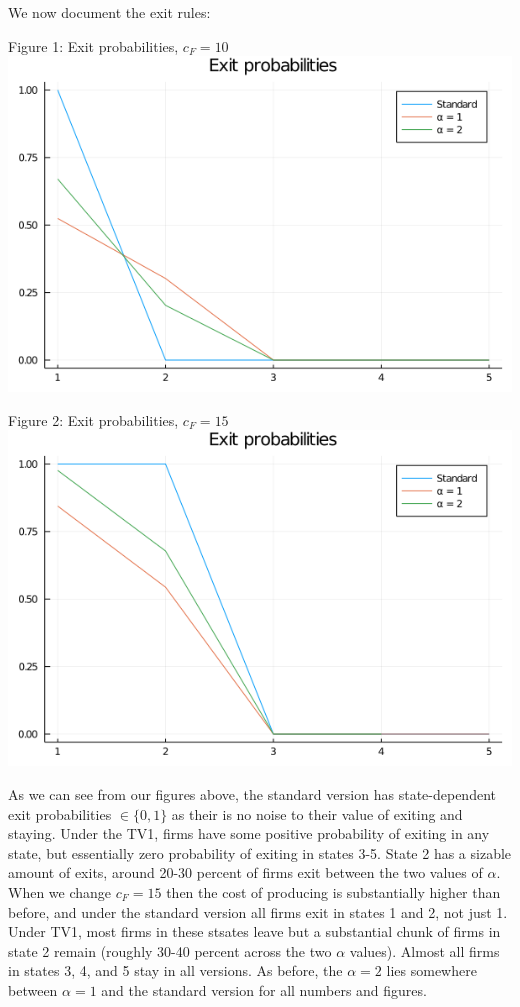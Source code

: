 \documentclass[11pt]{article} %
\begin{document}
We now document the exit rules:

\begin{center}
Figure 1: Exit probabilities, $c_F = 10$
\includegraphics[scale=0.5]{exit_prob_1}

\bigskip

Figure 2: Exit probabilities, $c_F = 15$
\includegraphics[scale=0.5]{exit_prob_2}
\end{center}

As we can see from our figures above, the standard version has state-dependent exit probabilities $\in \{0,1\}$ as their is no noise to their value of exiting and staying. Under the TV1, firms have some positive probability of exiting in any state, but essentially zero probability of exiting in states 3-5. State 2 has a sizable amount of exits, around 20-30 percent of firms exit between the two values of $\alpha$. When we change $c_F = 15$ then the cost of producing is substantially higher than before, and under the standard version all firms exit in states 1 and 2, not just 1. Under TV1, most firms in these stsates leave but a substantial chunk of firms in state 2 remain (roughly 30-40 percent across the two $\alpha$ values). Almost all firms in states 3, 4, and 5 stay in all versions. As before, the $\alpha = 2$ lies somewhere between $\alpha = 1$ and the standard version for all numbers and figures.
\end{document}
